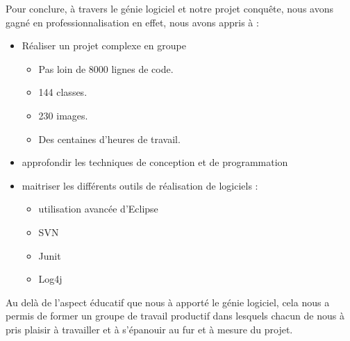 Pour conclure, à travers le génie logiciel et notre projet conquête, nous avons gagné en professionnalisation en effet, nous avons appris à :\\

  \begin{itemize}
    \item Réaliser un projet complexe en groupe
    \begin{itemize}
    	\item Pas loin de 8000 lignes de code.
    	\item 144 classes.
    	\item 230 images.
    	\item Des centaines d'heures de travail.\\
    	\end{itemize}
    \item approfondir les techniques de conception et de programmation\\
    \item maitriser les différents outils de réalisation de logiciels : 
    	\begin{itemize}
    	\item utilisation avancée d'Eclipse
    	\item SVN
    	\item Junit
    	\item Log4j\\
    	\end{itemize}
  \end{itemize}
Au delà  de l'aspect éducatif que nous à apporté le génie logiciel, cela nous a permis de former un groupe de travail productif dans lesquels chacun de nous à pris plaisir à travailler et à s'épanouir au fur et à mesure du projet.